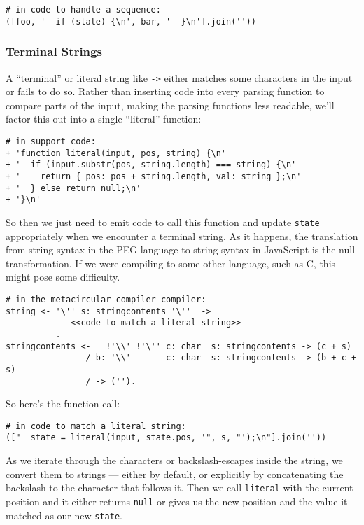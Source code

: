 \documentclass[
]{article}
\begin{document}
\begin{verbatim}
# in code to handle a sequence:
([foo, '  if (state) {\n', bar, '  }\n'].join(''))
\end{verbatim}

\hypertarget{terminal-strings}{%
\subsubsection{Terminal Strings}\label{terminal-strings}}

A ``terminal'' or literal string like
\texttt{\textquotesingle{}-\textgreater{}\textquotesingle{}} either
matches some characters in the input or fails to do so. Rather than
inserting code into every parsing function to compare parts of the
input, making the parsing functions less readable, we'll factor this out
into a single ``literal'' function:

\begin{verbatim}
# in support code:
+ 'function literal(input, pos, string) {\n'
+ '  if (input.substr(pos, string.length) === string) {\n'
+ '    return { pos: pos + string.length, val: string };\n'
+ '  } else return null;\n'
+ '}\n'
\end{verbatim}

So then we just need to emit code to call this function and update
\texttt{state} appropriately when we encounter a terminal string. As it
happens, the translation from string syntax in the PEG language to
string syntax in JavaScript is the null transformation. If we were
compiling to some other language, such as C, this might pose some
difficulty.

\begin{verbatim}
# in the metacircular compiler-compiler:
string <- '\'' s: stringcontents '\''_ ->
             <<code to match a literal string>>
          .
stringcontents <-   !'\\' !'\'' c: char  s: stringcontents -> (c + s)
                / b: '\\'       c: char  s: stringcontents -> (b + c + s)
                / -> ('').
\end{verbatim}

So here's the function call:

\begin{verbatim}
# in code to match a literal string:                   
(["  state = literal(input, state.pos, '", s, "');\n"].join(''))
\end{verbatim}

As we iterate through the characters or backslash-escapes inside the
string, we convert them to strings --- either by default, or explicitly
by concatenating the backslash to the character that follows it. Then we
call \texttt{literal} with the current position and it either returns
\texttt{null} or gives us the new position and the value it matched as
our new \texttt{state}.
\end{document}
